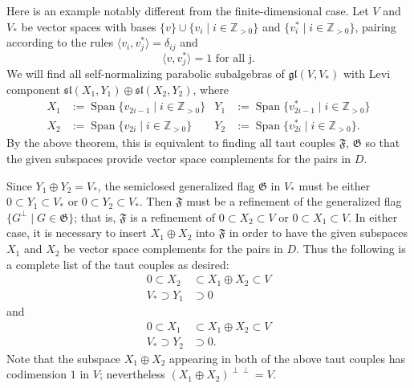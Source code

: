 \documentclass{amsart}
\theoremstyle{definition}
\theoremstyle{remark}
\numberwithin{equation}{section}
\newcommand {\Z} {\mathbb{Z}}
\def\gl{\mathfrak {gl}}
\def\sl{\mathfrak{sl}}
\def\F{\mathfrak{F}}
\def\G{\mathfrak{G}}
\newcommand {\Span}{\operatorname{Span}}
\begin{document}
Here is an example notably different from the finite-dimensional case.  Let $V$ and $V_*$ be vector spaces with bases $\{ v \} \cup \{ v_ i \mid i \in \Z_{> 0} \}$ and $\{ v_ i^* \mid i \in \Z_{> 0} \}$, pairing according to the rules
$\langle v_i , v_j^* \rangle = \delta_{ij}$ and  $$\langle v, v_j^* \rangle = 1 \textrm{ for all j.}$$
We will find all self-normalizing parabolic subalgebras of $\gl(V,V_*)$ with Levi component $\sl(X_1 , Y_1) \oplus \sl(X_2 , Y_2)$, where 
\begin{align*}
X_1 & :=  \Span \{ v_{2i-1} \mid i \in \Z_{>0} \} & Y_1 & :=  \Span \{ v_{2i-1}^* \mid i \in \Z_{>0} \} \\
 X_2 & :=   \Span \{ v_{2i} \mid i \in \Z_{>0} \}  & Y_2 & :=  \Span \{ v_{2i}^* \mid i \in \Z_{>0} \}.
\end{align*}
By the above theorem, this is equivalent to finding all taut couples $\F$, $\G$ so that the given subspaces provide vector space complements for the pairs in $D$.

Since $Y_1 \oplus Y_2 = V_*$, the semiclosed generalized flag $\G$ in $V_*$ must be either
$0 \subset Y_1 \subset V_*$ or  $0 \subset Y_2 \subset V_*$.  Then $\F$ must be a refinement of the generalized flag $\{ G^\perp \mid G \in \G \}$; that is, $\F$ is a refinement of $0 \subset X_2 \subset V$ or  $0 \subset X_1 \subset V$.  In either case, it is necessary to insert $X_1 \oplus X_2$ into $\F$ in order to have the given subspaces $X_1$ and $X_2$ be vector space complements for the pairs in $D$.  Thus the following is a complete list of the taut couples as desired:
\begin{align*}
0  \subset X_2  & \subset  X_1 \oplus X_2 \subset V \\
V_*  \supset Y_1 & \supset  0  
\end{align*}
and 
\begin{align*}
0 \subset X_1  & \subset  X_1 \oplus X_2 \subset V \\
V_* \supset Y_2 & \supset  0.  
\end{align*}
Note that the subspace $X_1 \oplus X_2$ appearing in both of the above taut couples has codimension $1$ in $V$; nevertheless $(X_1 \oplus X_2)^{\perp \perp} = V$.
  
\end{document}
